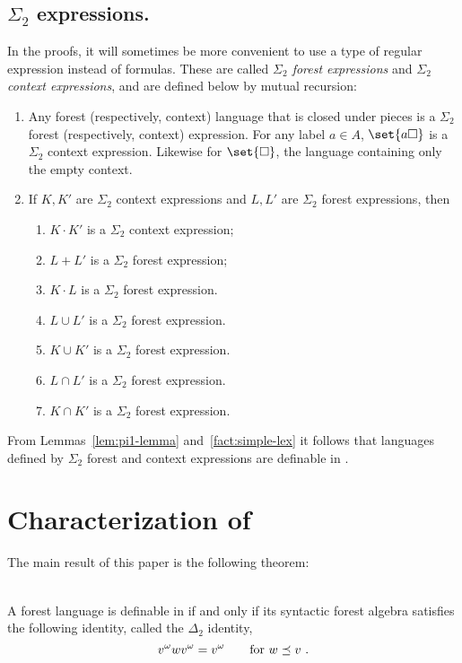 \documentclass{LMCS}
\begin{document}
\subsection{\texorpdfstring{$\Sigma_2$}{Sigma2} expressions.}
In the proofs, it will sometimes be more convenient to use a type of regular expression instead of formulas. These are called  \emph{$\Sigma_2$ forest expressions} and \emph{$\Sigma_2$ context
  expressions}, and are defined below by mutual recursion:
  \begin{enumerate}[$\bullet$]
  \item Any forest (respectively, context) language that is closed
    under pieces is a $\Sigma_2$ forest (respectively, context)
    expression.  For any label $a \in A$, $\set{a\hole}$ is a
    $\Sigma_2$ context expression. Likewise for $\set{\hole}$, the language containing only the empty context.
\item If $K,K'$ are $\Sigma_2$ context expressions and $L,L'$ are
  $\Sigma_2$ forest expressions, then
  \begin{enumerate}[$-$]
  \item $K \cdot K'$ is a $\Sigma_2$ context expression;
\item $L + L'$ is a $\Sigma_2$ forest expression;
\item $K \cdot L$ is a $\Sigma_2$ forest expression.
\item $L \cup L'$ is a $\Sigma_2$ forest expression. 
\item $K \cup K'$ is a $\Sigma_2$ forest expression. 
\item $L \cap L'$ is a $\Sigma_2$ forest expression. 
\item $K \cap K'$ is a $\Sigma_2$ forest expression. 
  \end{enumerate}
  \end{enumerate}
From Lemmas~\ref{lem:pi1-lemma} and~\ref{fact:simple-lex}  it follows that languages defined by  $\Sigma_2$ forest
and context expressions are definable in \Stwol.



\section{Characterization of \texorpdfstring{\Dtwol}{Dtwol}}
\label{sec:char-inter}
The main result of this paper is the following theorem:

\begin{thm}\label{thm:main}\ \vspace{-0.3cm} \\ 
 A forest language is definable in \Dtwol if and only if its syntactic
  forest algebra satisfies the following  identity, called the
  $\Delta_2$ identity,
  \begin{equation}
    \label{eq:swallow}
    v^\omega w v^\omega = v^\omega \qquad \mbox{for }w \piece v\ .
  \end{equation}
\end{thm}
\end{document}
